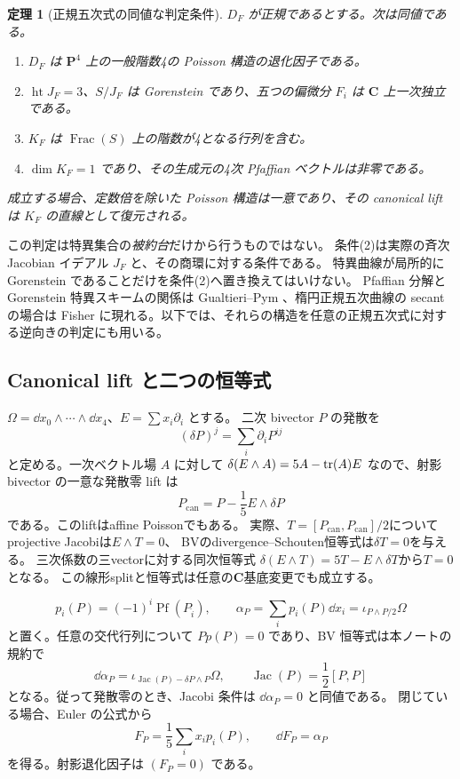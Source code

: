 \documentclass[11pt,a4paper]{ltjsarticle}
\newcommand{\CC}{\mathbf C}\newcommand{\QQ}{\mathbf Q}
\newcommand{\PP}{\mathbf P}\renewcommand{\AA}{\mathbf A}
\DeclareMathOperator{\Pf}{Pf}\DeclareMathOperator{\length}{length}
\newtheorem{theorem}{定理}[section]
\theoremstyle{remark}\newtheorem{remark}[theorem]{注意}
\begin{document}
\begin{theorem}[正規五次式の同値な判定条件]\label{thm:recognition}
$D_F$ が正規であるとする。次は同値である。
\begin{enumerate}
\item $D_F$ は $\PP^4$ 上の一般階数4の Poisson 構造の退化因子である。
\item $\operatorname{ht}J_F=3$、$S/J_F$ は Gorenstein であり、五つの偏微分 $F_i$ は $\CC$ 上一次独立である。
\item $K_F$ は $\operatorname{Frac}(S)$ 上の階数が4となる行列を含む。
\item $\dim K_F=1$ であり、その生成元の4次 Pfaffian ベクトルは非零である。
\end{enumerate}
成立する場合、定数倍を除いた Poisson 構造は一意であり、その canonical lift は $K_F$ の直線として復元される。
\end{theorem}

この判定は特異集合の\emph{被約台}だけから行うものではない。
条件(2)は実際の斉次 Jacobian イデアル $J_F$ と、その商環に対する条件である。
特異曲線が局所的に Gorenstein であることだけを条件(2)へ置き換えてはいけない。
Pfaffian 分解と Gorenstein 特異スキームの関係は
Gualtieri--Pym \cite{GP}、楕円正規五次曲線の secant の場合は Fisher \cite[\S10]{Fisher}
に現れる。以下では、それらの構造を任意の正規五次式に対する逆向きの判定にも用いる。

\subsection{Canonical lift と二つの恒等式}

$\Omega=\dd x_0\wedge\cdots\wedge\dd x_4$、$E=\sum x_i\partial_i$ とする。
二次 bivector $P$ の発散を
\[
 (\delta P)^j=\sum_i\partial_iP^{ij}
\]
と定める。一次ベクトル場 $A$ に対して
$\delta(E\wedge A)=5A-\operatorname{tr}(A)E$ なので、射影 bivector の一意な発散零 lift は
\[
                  P_{\mathrm{can}}=P-\frac15 E\wedge\delta P
\]
である。このliftはaffine Poissonでもある。
実際、$T=[P_{\mathrm{can}},P_{\mathrm{can}}]/2$についてprojective Jacobiは$E\wedge T=0$、
BVのdivergence--Schouten恒等式は$\delta T=0$を与える。
三次係数の三vectorに対する同次恒等式
$\delta(E\wedge T)=5T-E\wedge\delta T$から$T=0$となる。
この線形splitと恒等式は任意の$\CC$基底変更でも成立する。

\[
 p_i(P)=(-1)^i\Pf(P_{\widehat i}),\qquad
 \alpha_P=\sum_i p_i(P)\dd x_i=\iota_{P\wedge P/2}\Omega
\]
と置く。任意の交代行列について $Pp(P)=0$ であり、BV 恒等式は本ノートの規約で
\begin{equation}\label{eq:BV}
 \dd\alpha_P=\iota_{\operatorname{Jac}(P)-\delta P\wedge P}\Omega,
 \qquad \operatorname{Jac}(P)=\frac12[P,P]
\end{equation}
となる。従って発散零のとき、Jacobi 条件は $\dd\alpha_P=0$ と同値である。
閉じている場合、Euler の公式から
\[
       F_P=\frac15\sum_i x_i p_i(P),\qquad \dd F_P=\alpha_P
\]
を得る。射影退化因子は $(F_P=0)$ である。
\end{document}

